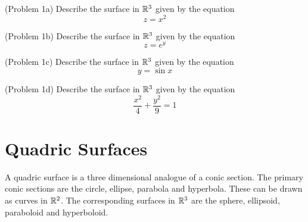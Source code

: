 \documentclass[handout]{ximera}
\begin{document}
\begin{problem}(Problem 1a)
Describe the surface in $\mathbb R^3$ given by the equation
\[
z= x^2
\]
\end{problem}

\begin{problem}(Problem 1b)
Describe the surface in $\mathbb R^3$ given by the equation
\[
z= e^y
\]
\end{problem}

\begin{problem}(Problem 1c)
Describe the surface in $\mathbb R^3$ given by the equation
\[
y= \sin{x}
\]
\end{problem}

\begin{problem}(Problem 1d)
Describe the surface in $\mathbb R^3$ given by the equation
\[
\frac{x^2}{4} + \frac{y^2}{9} = 1
\]
\end{problem}



\section{Quadric Surfaces}
A quadric surface is a three dimensional analogue of a conic section.
The primary conic sections are the circle, ellipse, parabola and hyperbola. 
These can be drawn as curves in $\mathbb R^2$.
The corresponding surfaces in $\mathbb R^3$ are the sphere, ellipsoid, paraboloid and hyperboloid. 
\begin{image}
\end{image}

\begin{image}
\end{image}


\begin{image}
\end{image}
\end{document}
